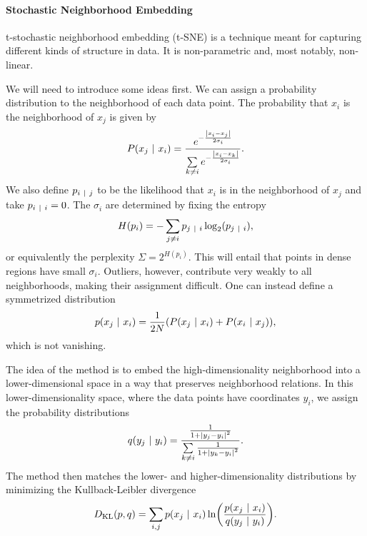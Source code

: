 \paragraph{Stochastic Neighborhood Embedding}
t-stochastic neighborhood embedding (t-SNE) is a technique meant for capturing different kinds of structure in data. It is non-parametric and, most notably, non-linear.

We will need to introduce some ideas first. We can assign a probability distribution to the neighborhood of each data point. The probability that $x_{i}$ is the neighborhood of $x_{j}$ is given by
\begin{align*}
	P(x_{j}\ \vert\  x_{i}) = \frac{e^{-\frac{\abs{x_{i} - x_{j}}}{2\sigma_{i}}}}{\sum\limits_{k\neq i}e^{-\frac{\abs{x_{i} - x_{k}}}{2\sigma_{i}}}}.
\end{align*}
We also define $p_{i\ \vert\  j}$ to be the likelihood that $x_{i}$ is in the neighborhood of $x_{j}$ and take $p_{i\ \vert\  i} = 0$. The $\sigma_{i}$ are determined by fixing the entropy
\begin{align*}
	H(p_{i}) = -\sum\limits_{j\neq i}p_{j\ \vert\  i}\log_{2}(p_{j\ \vert\  i}),
\end{align*}
or equivalently the perplexity $\Sigma = 2^{H(p_{i})}$. This will entail that points in dense regions have small $\sigma_{i}$. Outliers, however, contribute very weakly to all neighborhoods, making their assignment difficult. One can instead define a symmetrized distribution
\begin{align*}
	p(x_{j}\ \vert\  x_{i}) = \frac{1}{2N}(P(x_{j}\ \vert\  x_{i}) + P(x_{i}\ \vert\  x_{j})),
\end{align*}
which is not vanishing.

The idea of the method is to embed the high-dimensionality neighborhood into a lower-dimensional space in a way that preserves neighborhood relations. In this lower-dimensionality space, where the data points have coordinates $y_{i}$, we assign the probability distributions
\begin{align*}
	q(y_{j}\ \vert\  y_{i}) = \frac{\frac{1}{1 + \abs{y_{j} - y_{i}}^{2}}}{\sum\limits_{k\neq i}\frac{1}{1 + \abs{y_{k} - y_{i}}^{2}}}.
\end{align*}
The method then matches the lower- and higher-dimensionality distributions by minimizing the Kullback-Leibler divergence
\begin{align*}
	D_{\text{KL}}(p, q) = \sum\limits_{i, j}p(x_{j}\ \vert\  x_{i})\ln(\frac{p(x_{j}\ \vert\  x_{i})}{q(y_{j}\ \vert\  y_{i})}).
\end{align*}

